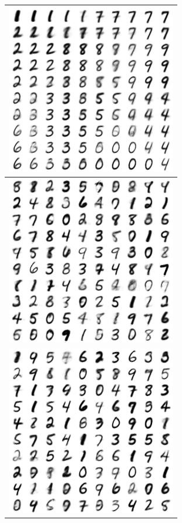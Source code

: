 \documentclass[letterpaper, twoside]{article}
\begin{document}
\begin{figure}[H]
\centering
\begin{minipage}{.33\textwidth}
\begin{flushleft}
\begin{tabular}{|@{}c@{}|}\hline
\includegraphics[scale=1]{manifold_86.jpg}\\ \hline
\includegraphics[scale=1]{manifold_87.jpg}\\ \hline
\includegraphics[scale=1]{manifold_88.jpg}\\\hline

\end{tabular}
\end{flushleft}
\end{minipage}
\end{figure}
\end{document}
